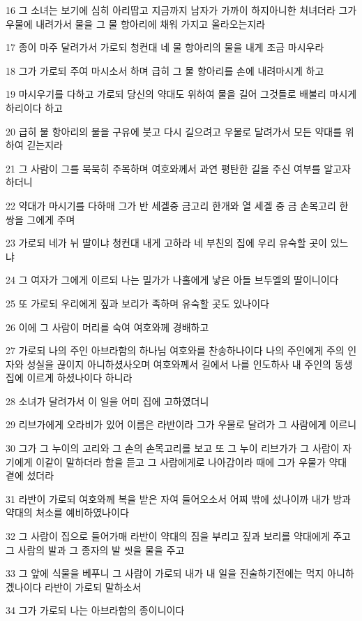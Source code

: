\par 16 그 소녀는 보기에 심히 아리땁고 지금까지 남자가 가까이 하지아니한 처녀더라 그가 우물에 내려가서 물을 그 물 항아리에 채워 가지고 올라오는지라
\par 17 종이 마주 달려가서 가로되 청컨대 네 물 항아리의 물을 내게 조금 마시우라
\par 18 그가 가로되 주여 마시소서 하며 급히 그 물 항아리를 손에 내려마시게 하고
\par 19 마시우기를 다하고 가로되 당신의 약대도 위하여 물을 길어 그것들로 배불리 마시게 하리이다 하고
\par 20 급히 물 항아리의 물을 구유에 붓고 다시 길으려고 우물로 달려가서 모든 약대를 위하여 긷는지라
\par 21 그 사람이 그를 묵묵히 주목하며 여호와께서 과연 평탄한 길을 주신 여부를 알고자 하더니
\par 22 약대가 마시기를 다하매 그가 반 세겔중 금고리 한개와 열 세겔 중 금 손목고리 한 쌍을 그에게 주며
\par 23 가로되 네가 뉘 딸이냐 청컨대 내게 고하라 네 부친의 집에 우리 유숙할 곳이 있느냐
\par 24 그 여자가 그에게 이르되 나는 밀가가 나홀에게 낳은 아들 브두엘의 딸이니이다
\par 25 또 가로되 우리에게 짚과 보리가 족하며 유숙할 곳도 있나이다
\par 26 이에 그 사람이 머리를 숙여 여호와께 경배하고
\par 27 가로되 나의 주인 아브라함의 하나님 여호와를 찬송하나이다 나의 주인에게 주의 인자와 성실을 끊이지 아니하셨사오며 여호와께서 길에서 나를 인도하사 내 주인의 동생집에 이르게 하셨나이다 하니라
\par 28 소녀가 달려가서 이 일을 어미 집에 고하였더니
\par 29 리브가에게 오라비가 있어 이름은 라반이라 그가 우물로 달려가 그 사람에게 이르니
\par 30 그가 그 누이의 고리와 그 손의 손목고리를 보고 또 그 누이 리브가가 그 사람이 자기에게 이같이 말하더라 함을 듣고 그 사람에게로 나아감이라 때에 그가 우물가 약대 곁에 섰더라
\par 31 라반이 가로되 여호와께 복을 받은 자여 들어오소서 어찌 밖에 섰나이까 내가 방과 약대의 처소를 예비하였나이다
\par 32 그 사람이 집으로 들어가매 라반이 약대의 짐을 부리고 짚과 보리를 약대에게 주고 그 사람의 발과 그 종자의 발 씻을 물을 주고
\par 33 그 앞에 식물을 베푸니 그 사람이 가로되 내가 내 일을 진술하기전에는 먹지 아니하겠나이다 라반이 가로되 말하소서
\par 34 그가 가로되 나는 아브라함의 종이니이다
